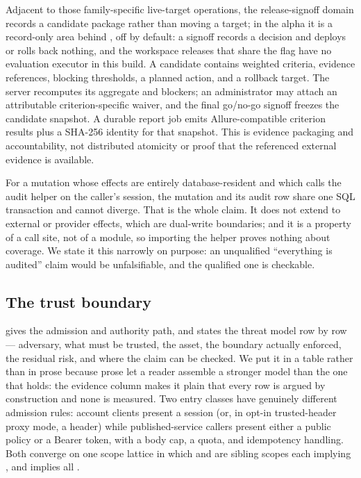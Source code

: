 Adjacent to those family-specific live-target operations, the release-signoff
domain records a candidate package rather than moving a target; in the alpha it is
a record-only area behind , off by
default: a signoff records a decision and deploys or rolls back nothing, and the
workspace releases that share the flag have no evaluation executor in this build.  A candidate
contains weighted criteria, evidence references, blocking thresholds, a planned
action, and a rollback target.  The server recomputes its aggregate and blockers;
an administrator may attach an attributable criterion-specific waiver, and the
final go/no-go signoff freezes the candidate snapshot.  A durable report job emits
Allure-compatible criterion results plus a SHA-256 identity for that snapshot.
This is evidence packaging and accountability, not distributed atomicity or proof
that the referenced external evidence is available.

 For a mutation whose effects are
entirely database-resident and which calls the audit helper on the caller's
session, the mutation and its audit row share one SQL transaction and cannot
diverge. That is the whole claim. It does not extend to external \mlflow{} or
provider effects, which are dual-write boundaries; and it is a property of a call
site, not of a module, so importing the helper proves nothing about coverage. We
state it this narrowly on purpose: an unqualified ``everything is audited'' claim
would be unfalsifiable, and the qualified one is checkable.

\subsection{The trust boundary}



 gives the admission and authority path, and
 states the threat model row by row --- adversary, what must be
trusted, the asset, the boundary actually enforced, the residual risk, and where the
claim can be checked. We put it in a table rather than in prose because prose let a
reader assemble a stronger model than the one that holds: the evidence column makes
it plain that every row is argued by construction and none is measured. Two entry classes have
genuinely different admission rules: account clients present a session (or, in
opt-in trusted-header proxy mode, a header) while published-service callers present
either a public policy or a Bearer token, with a body cap, a quota, and
idempotency handling. Both converge on one scope lattice in which \operator{} and
\approver{} are sibling scopes each implying \viewer{}, and \admin{} implies all
\statScopesW{}.

